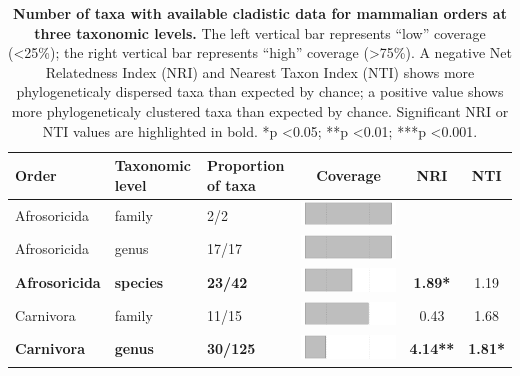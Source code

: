 \begin{longtable}{lL{1.8cm}C{2cm}ccc}
\caption[Number of taxa with available cladistic data for mammalian orders]{\textbf{Number of taxa with available cladistic data for mammalian orders at three taxonomic levels.} The left vertical bar represents ``low'' coverage (\textless 25\%); the right vertical bar represents ``high'' coverage (\textgreater 75\%). A negative Net Relatedness Index (NRI) and Nearest Taxon Index (NTI) shows more phylogeneticaly dispersed taxa than expected by chance; a positive value shows more phylogeneticaly clustered taxa than expected by chance. Significant NRI or NTI values are highlighted in bold. *p \textless 0.05; **p \textless 0.01; ***p \textless 0.001.} \\ 
  \hline
\textbf{Order} & \textbf{Taxonomic level} & \textbf{Proportion of taxa} & \textbf{Coverage} & \textbf{NRI} & \textbf{NTI} \\ 
  \hline
Afrosoricida & family & 2/2 & \includegraphics[width=0.20\linewidth, height=0.05\linewidth]{Missing_mammals/Table_figures/bar1.pdf} &   &   \\ 
  Afrosoricida & genus & 17/17 & \includegraphics[width=0.20\linewidth, height=0.05\linewidth]{Missing_mammals/Table_figures/bar2.pdf} &   &   \\ 
  \textbf{Afrosoricida} & \textbf{species} & \textbf{23/42} & \includegraphics[width=0.20\linewidth, height=0.05\linewidth]{Missing_mammals/Table_figures/bar3.pdf} & \textbf{1.89*} & 1.19 \\ 
  Carnivora & family & 11/15 & \includegraphics[width=0.20\linewidth, height=0.05\linewidth]{Missing_mammals/Table_figures/bar4.pdf} & 0.43 & 1.68 \\ 
  \textbf{Carnivora} & \textbf{genus} & \textbf{30/125} & \includegraphics[width=0.20\linewidth, height=0.05\linewidth]{Missing_mammals/Table_figures/bar5.pdf} & \textbf{4.14**} & \textbf{1.81*} \\ 

\end{longtable}
